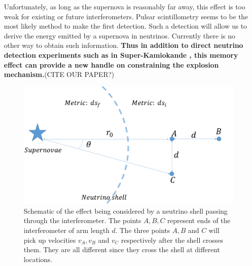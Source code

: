 \documentclass[aps,showpacs,onecolumn,floats,prd,superscriptaddress,nofootinbib]{revtex4-1}
\begin{document}
Unfortunately, as long as the supernova is reasonably far away, this effect is too weak for existing or future interferometers. 
Pulsar scintillometry seems to be the most likely method to make the first detection. 
Such a detection will allow us to derive the energy emitted by a supernova in neutrinos. 
Currently there is no other way to obtain such information. 
\textbf{Thus in addition to direct neutrino detection experiments such as in Super-Kamiokande \cite{SuperKSN}, this memory effect can provide a new handle on constraining the explosion mechanism.}(CITE OUR PAPER?)

\begin{figure}[b!]
\begin{center}
\includegraphics[scale = 0.27]{intro.pdf}
\caption{Schematic of the effect being considered by a neutrino shell passing through the interferometer. The points $A,B,C$ represent ends of the interferometer of arm length $d$. The three points $A,B$ and $C$ will pick up velocities $v_A, v_B$ and $v_C$ respectively after the shell crosses them. They are all different since they cross the shell at different locations.}
\label{fig:1}
\end{center}
\end{figure}



\end{document}
